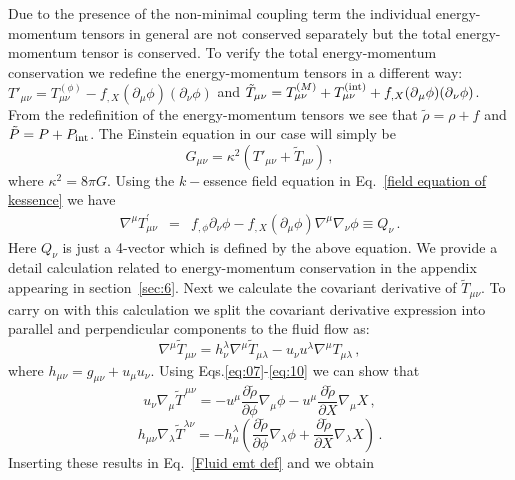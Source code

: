 \documentclass[a4paper,12pt]{article}
\newcommand{\ti}[1]{\ensuremath{ \tilde{#1}}}
\newcommand{\nb}{\ensuremath{ \nabla }}
\newcommand{\m}{\ensuremath{{\mu \nu}}}
\newcommand{\p}{\ensuremath{\partial{}}}
\begin{document}
Due to the presence of the non-minimal coupling term the individual energy-momentum tensors in general are not conserved separately but the total energy-momentum tensor is conserved. To verify the total energy-momentum conservation we redefine the energy-momentum tensors in a different way: 
$T'_{\m} = T^{(\phi)}_{\mu \nu} - f_{,X}(\p_\mu \phi)(\p_\nu \phi)$ and $\tilde{T}_{\mu \nu} = T^{(M)}_{\m} + T^{({\rm int})}_{\m} + f_{,X}(\p_\mu \phi)(\p_\nu \phi)$. From the redefinition of the energy-momentum tensors we see that $\ti{\rho} = \rho + f$ and $\ti{P} = P + P_{\rm int} $. The Einstein equation in our case will simply be \begin{equation}\label{}
G_{\m} =\kappa^2 (T'_{\mu\nu}+\tilde{T}_{\mu\nu})\,,
\end{equation}
where $\kappa^2 = 8\pi G$. Using the $k-$essence field equation in Eq.~\eqref{field equation of kessence} we have 
\begin{eqnarray}
\nabla^{\mu} T^{\prime}_{\mu\nu} &=& f_{,\phi}\partial_{\nu}\phi - f_{,X}(\partial_{\mu}\phi) \nabla^{\mu} \nabla_{\nu} \phi \equiv  Q_{\nu}\,.
\label{Conserved scalar field}
\end{eqnarray}
Here $Q_\nu$ is just a 4-vector which is defined by the above equation.  
We provide a detail calculation related to energy-momentum conservation in  the appendix appearing in section~\ref{sec:6}. Next we calculate the covariant derivative of $\tilde{T}_{\mu\nu}$. To carry on with this calculation we split the covariant derivative expression into
parallel and perpendicular components to the fluid flow as:
%
\begin{equation}\label{Fluid emt def}
\nb^{\mu}	\ti{T}_{\m} = h_{\nu}^{\lambda}\nb^{\mu} \ti{T}_{\mu \lambda} - u_\nu u^\lambda \nb^{\mu}T_{\mu \lambda}\,, 
\end{equation}
where $h_{\m} = g_{\m} + u_{\mu}u_{\nu }$. Using Eqs.\eqref{eq:07}-\eqref{eq:10} we can show that 
%
\begin{equation}\label{perpendicular component}
u_\nu \nb_{\mu}\ti{T}^{\,\m} = -u^{\mu}\dfrac{\p \ti{\rho}}{\p \phi}\nb_{\mu} \phi - u^{\mu}\dfrac{\p \ti{\rho}}{\p X}\nb_{\mu} X\,,
\end{equation}
%
\begin{equation}\label{parallel component}
h_{\m}\nb_{\lambda}\ti{T}^{\lambda \nu}	 = -h^{\lambda}_{\mu}\left( \dfrac{\p\ti{\rho}}{\p \phi}\nb_{\lambda}\phi + \dfrac{\p\ti{\rho}}{\p X}\nb_{\lambda}X\right)\,. 
\end{equation}
%
Inserting these results in Eq.~\eqref{Fluid emt def} and we obtain  
\end{document}
